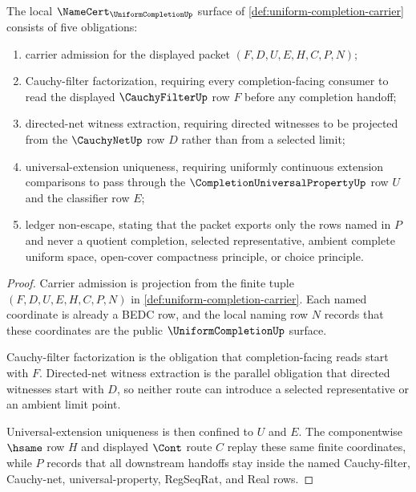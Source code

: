 \begin{theorem}
\label{thm:uniform-completion-namecert-obligation-surface}
The local $\NameCert_{\UniformCompletionUp}$ surface of
\autoref{def:uniform-completion-carrier} consists of five obligations:
\begin{enumerate}
\item carrier admission for the displayed packet $(F,D,U,E,H,C,P,N)$;
\item Cauchy-filter factorization, requiring every completion-facing consumer
to read the displayed $\CauchyFilterUp$ row $F$ before any completion handoff;
\item directed-net witness extraction, requiring directed witnesses to be
projected from the $\CauchyNetUp$ row $D$ rather than from a selected limit;
\item universal-extension uniqueness, requiring uniformly continuous extension
comparisons to pass through the $\CompletionUniversalPropertyUp$ row $U$ and
the classifier row $E$;
\item ledger non-escape, stating that the packet exports only the rows named in
$P$ and never a quotient completion, selected representative, ambient
complete uniform space, open-cover compactness principle, or choice principle.
\end{enumerate}
\end{theorem}
\begin{proof}
Carrier admission is projection from the finite tuple
$(F,D,U,E,H,C,P,N)$ in \autoref{def:uniform-completion-carrier}. Each named
coordinate is already a BEDC row, and the local naming row $N$ records that
these coordinates are the public $\UniformCompletionUp$ surface.

Cauchy-filter factorization is the obligation that completion-facing reads
start with $F$. Directed-net witness extraction is the parallel obligation
that directed witnesses start with $D$, so neither route can introduce a
selected representative or an ambient limit point.

Universal-extension uniqueness is then confined to $U$ and $E$. The
componentwise $\hsame$ row $H$ and displayed $\Cont$ route $C$ replay these
same finite coordinates, while $P$ records that all downstream handoffs stay
inside the named Cauchy-filter, Cauchy-net, universal-property, RegSeqRat, and
Real rows.
\end{proof}

